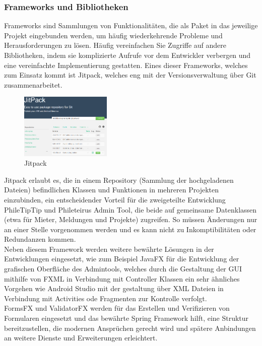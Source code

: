
\subsubsection{Frameworks und Bibliotheken}

Frameworks sind Sammlungen von Funktionalitäten, die als Paket in das jeweilige Projekt eingebunden werden, um häufig wiederkehrende Probleme und Herausforderungen zu lösen. Häufig vereinfachen Sie Zugriffe auf andere Bibliotheken, indem sie komplizierte Aufrufe vor dem Entwickler verbergen und eine vereinfachte Implementierung gestatten. Eines dieser Frameworks, welches zum Einsatz kommt ist Jitpack, welches eng mit der Versionsverwaltung über Git zusammenarbeitet.\\

\begin{figure}[!h]
\centering
\includegraphics[width=4.35cm, height=3.1cm]{jitpack}
\caption{Jitpack}
\end{figure}

Jitpack erlaubt es, die in einem Repository (Sammlung der hochgeladenen Dateien) befindlichen Klassen und Funktionen in mehreren Projekten einzubinden, ein entscheidender Vorteil für die zweigeteilte Entwicklung PhileTipTip und Phileteirus Admin Tool, die beide auf gemeinsame Datenklassen (etwa für Mieter, Meldungen und Projekte) zugreifen. So müssen Änderungen nur an einer Stelle vorgenommen werden und es kann nicht zu Inkomptibilitäten oder Redundanzen kommen.\\

Neben diesem Framework werden weitere bewährte Lösungen in der Entwicklungen eingesetzt, wie zum Beispiel JavaFX für die Entwicklung der grafischen Oberfläche des Admintools, welches durch die Gestaltung der GUI mithilfe von FXML in Verbindung mit Controller Klassen ein sehr ähnliches Vorgehen wie Android Studio mit der gestaltung über XML Dateien in Verbindung mit Activities ode Fragmenten zur Kontrolle verfolgt.\\ 

FormsFX und ValidatorFX werden für das Erstellen und Verifizieren von Formularen eingesetzt und das bewährte Spring Framework hilft, eine Struktur bereitzustellen, die modernen Ansprüchen gerecht wird und spätere Anbindungen an weitere Dienste und Erweiterungen erleichtert.\\